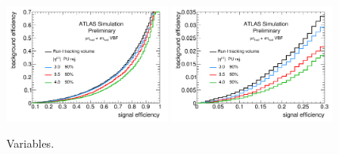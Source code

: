 \begin{figure}[tp]
  \centering
  \includegraphics[width=0.48\textwidth]{figures/ATL-PHYS-PUB-2014-018/fig_02a}
  \includegraphics[width=0.48\textwidth]{figures/ATL-PHYS-PUB-2014-018/fig_02b}
  \caption{Variables.}
  \label{fig:prospects-hllhc-rocs}
\end{figure}

